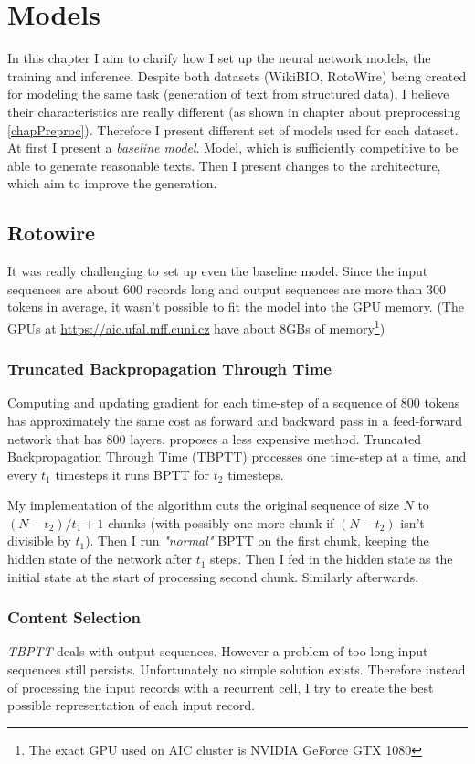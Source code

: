 \chapter{Models}
In this chapter I aim to clarify how I set up the neural network models, the training and inference. Despite both datasets (WikiBIO, RotoWire) being created for modeling the same task (generation of text from structured data), I believe their characteristics are really different (as shown in chapter about preprocessing \ref{chapPreproc}). Therefore I present different set of models used for each dataset. At first I present a \emph{baseline model}. Model, which is sufficiently competitive to be able to generate reasonable texts. Then I present changes to the architecture, which aim to improve the generation.

\section{Rotowire}

It was really challenging to set up even the baseline model. Since the input sequences are about 600 records long and output sequences are more than 300 tokens in average, it wasn't possible to fit the model into the GPU memory. (The GPUs at \url{https://aic.ufal.mff.cuni.cz} have about 8GBs of memory\footnote{The exact GPU used on AIC cluster is NVIDIA GeForce GTX 1080})

\subsection{Truncated Backpropagation Through Time}

Computing and updating gradient for each time-step of a sequence of 800 tokens has approximately the same cost as forward and backward pass in a feed-forward network that has 800 layers. \citep{williamsTBPTT} proposes a less expensive method. Truncated Backpropagation Through Time (TBPTT) processes one time-step at a time, and every $t_1$ timesteps it runs BPTT for $t_2$ timesteps.

My implementation of the algorithm cuts the original sequence of size $N$ to $( N - t_2 ) / t_1 + 1$ chunks (with possibly one more chunk if $(N - t_2)$ isn't divisible by $t_1$). Then I run \emph{"normal"} BPTT on the first chunk, keeping the hidden state of the network after $t_1$ steps. Then I fed in the hidden state as the initial state at the start of processing second chunk. Similarly afterwards.

\subsection{Content Selection}

\emph{TBPTT} deals with output sequences. However a problem of too long input sequences still persists. Unfortunately no simple solution exists. Therefore instead of processing the input records with a recurrent cell, I try to create the best possible representation of each input record.